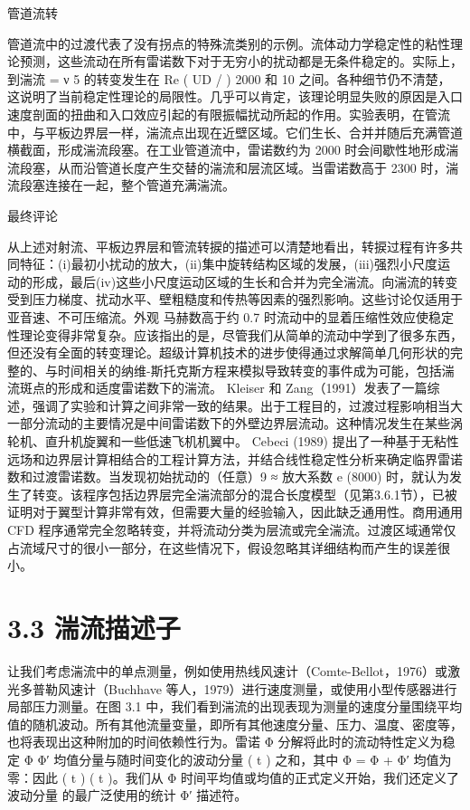 \documentclass[11pt,a4paper,openany,fontset=none]{ctexbook}
\begin{document}
管道流转

管道流中的过渡代表了没有拐点的特殊流类别的示例。流体动力学稳定性的粘性理论预测，这些流动在所有雷诺数下对于无穷小的扰动都是无条件稳定的。实际上，到湍流 = ν 5 的转变发生在 Re ( UD / ) 2000 和 10 之间。各种细节仍不清楚，这说明了当前稳定性理论的局限性。几乎可以肯定，该理论明显失败的原因是入口速度剖面的扭曲和入口效应引起的有限振幅扰动所起的作用。实验表明，在管流中，与平板边界层一样，湍流点出现在近壁区域。它们生长、合并并随后充满管道横截面，形成湍流段塞。在工业管道流中，雷诺数约为 2000 时会间歇性地形成湍流段塞，从而沿管道长度产生交替的湍流和层流区域。当雷诺数高于 2300 时，湍流段塞连接在一起，整个管道充满湍流。

最终评论

从上述对射流、平板边界层和管流转捩的描述可以清楚地看出，转捩过程有许多共同特征：(i)最初小扰动的放大，(ii)集中旋转结构区域的发展，(iii)强烈小尺度运动的形成，最后(iv)这些小尺度运动区域的生长和合并为完全湍流。向湍流的转变受到压力梯度、扰动水平、壁粗糙度和传热等因素的强烈影响。这些讨论仅适用于亚音速、不可压缩流。外观
马赫数高于约 0.7 时流动中的显着压缩性效应使稳定性理论变得非常复杂。应该指出的是，尽管我们从简单的流动中学到了很多东西，但还没有全面的转变理论。超级计算机技术的进步使得通过求解简单几何形状的完整的、与时间相关的纳维-斯托克斯方程来模拟导致转变的事件成为可能，包括湍流斑点的形成和适度雷诺数下的湍流。 Kleiser 和 Zang（1991）发表了一篇综述，强调了实验和计算之间非常一致的结果。出于工程目的，过渡过程影响相当大一部分流动的主要情况是中间雷诺数下的外壁边界层流动。这种情况发生在某些涡轮机、直升机旋翼和一些低速飞机机翼中。 Cebeci (1989) 提出了一种基于无粘性远场和边界层计算相结合的工程计算方法，并结合线性稳定性分析来确定临界雷诺数和过渡雷诺数。当发现初始扰动的（任意）9 ≈ 放大系数 e (8000) 时，就认为发生了转变。该程序包括边界层完全湍流部分的混合长度模型（见第3.6.1节），已被证明对于翼型计算非常有效，但需要大量的经验输入，因此缺乏通用性。商用通用 CFD 程序通常完全忽略转变，并将流动分类为层流或完全湍流。过渡区域通常仅占流域尺寸的很小一部分，在这些情况下，假设忽略其详细结构而产生的误差很小。

\section*{3.3 湍流描述子}

让我们考虑湍流中的单点测量，例如使用热线风速计（Comte-Bellot，1976）或激光多普勒风速计（Buchhave 等人，1979）进行速度测量，或使用小型传感器进行局部压力测量。在图 3.1 中，我们看到湍流的出现表现为测量的速度分量围绕平均值的随机波动。所有其他流量变量，即所有其他速度分量、压力、温度、密度等，也将表现出这种附加的时间依赖性行为。雷诺 Φ 分解将此时的流动特性定义为稳定 Φ Φ′ 均值分量与随时间变化的波动分量 ( t ) 之和，其中 Φ = Φ + Φ′ 均值为零：因此 ( t ) ( t )。我们从 Φ 时间平均值或均值的正式定义开始，我们还定义了波动分量 的最广泛使用的统计 Φ′ 描述符。
\end{document}
